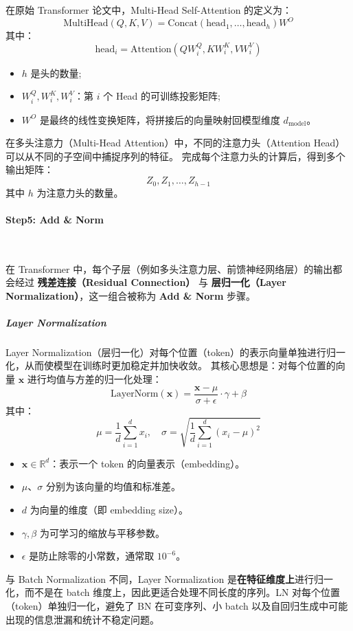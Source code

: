 在原始 Transformer 论文中，Multi-Head Self-Attention 的定义为：
\[
\text{MultiHead}(Q, K, V) = \text{Concat}(\text{head}_1, \dots, \text{head}_h) W^O
\]
其中：
\[
\text{head}_i = \text{Attention}(Q W_i^Q, K W_i^K, V W_i^V)
\]
\begin{itemize}
  \item $h$ 是头的数量;
  \item $W_i^Q, W_i^K, W_i^V$：第 $i$ 个 Head 的可训练投影矩阵; 
  \item $W^O$ 是最终的线性变换矩阵，将拼接后的向量映射回模型维度 $d_{\text{model}}$。
\end{itemize} 
 

在多头注意力（Multi-Head Attention）中，不同的注意力头（Attention Head）可以从不同的子空间中捕捉序列的特征。  
完成每个注意力头的计算后，得到多个输出矩阵：
\[
Z_0, Z_1, \dots, Z_{h-1}
\]
其中 $h$ 为注意力头的数量。




\clearpage
\paragraph{Step5: Add \& Norm}~{}

在 Transformer 中，每个子层（例如多头注意力层、前馈神经网络层）的输出都会经过 \textbf{残差连接（Residual Connection）} 与 \textbf{层归一化（Layer Normalization）}，这一组合被称为 \textbf{Add \& Norm} 步骤。

\subparagraph{Layer Normalization}  
Layer Normalization（层归一化）对每个位置（token）的表示向量单独进行归一化，从而使模型在训练时更加稳定并加快收敛。  
其核心思想是：对每个位置的向量 $\mathbf{x}$ 进行均值与方差的归一化处理：
\[
\text{LayerNorm}(\mathbf{x}) = \frac{\mathbf{x} - \mu}{\sigma + \epsilon} \cdot \gamma + \beta
\]
其中：
\[
\mu = \frac{1}{d} \sum_{i=1}^{d} x_i, \quad
\sigma = \sqrt{\frac{1}{d} \sum_{i=1}^{d} (x_i - \mu)^2}
\]
\begin{itemize}
  \item $\mathbf{x} \in \mathbb{R}^d$：表示一个 token 的向量表示（embedding）。
  \item $\mu$、$\sigma$ 分别为该向量的均值和标准差。
  \item $d$ 为向量的维度（即 embedding size）。
  \item $\gamma, \beta$ 为可学习的缩放与平移参数。
  \item $\epsilon$ 是防止除零的小常数，通常取 $10^{-6}$。
\end{itemize}

与 Batch Normalization 不同，Layer Normalization 是\textbf{在特征维度上}进行归一化，而不是在 batch 维度上，因此更适合处理不同长度的序列。LN 对每个位置（token）单独归一化，避免了 BN 在可变序列、小 batch 以及自回归生成中可能出现的信息泄漏和统计不稳定问题。


